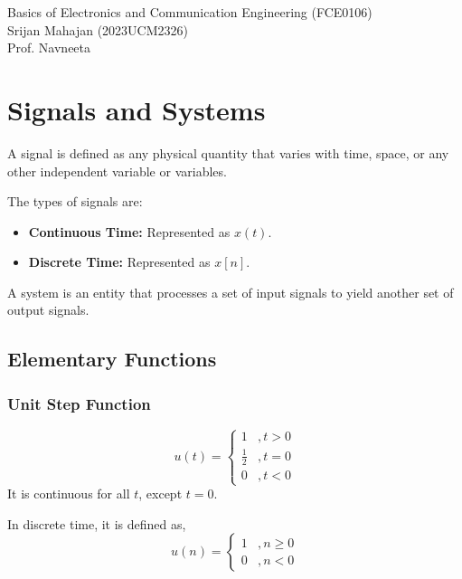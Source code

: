 


	\begin{titlepage}
			\begin{center}
			\Huge{Basics of Electronics and Communication Engineering (FCE0106)}\\
			Srijan Mahajan (2023UCM2326)\\
			Prof. Navneeta
		\end{center}
	\end{titlepage}
	\tableofcontents
	\newpage
	
	\chapter{Signals and Systems}

	A signal is defined as any physical quantity that varies with time, space, or any other independent variable or variables.
	
	The types of signals are: \begin{itemize}
		\item \textbf{ Continuous Time: }Represented as $x(t)$.
		\item \textbf{Discrete Time: }Represented as $x[n]$.
	\end{itemize}
	A system is an entity that processes a set of input signals to yield another set of output signals.
	\section{Elementary Functions}
	\subsection{Unit Step Function}
		\[u(t)=\begin{cases}
			1 &, t>0\\
			\frac{1}{2} &, t=0\\
			0&, t<0
			\end{cases}\]
			It is continuous for all $t$, except $t=0$. 
			\begin{figure}[H]
				\centering
			\end{figure}
			In discrete time, it is defined as,
			\[u(n)=\begin{cases}
				1 &, n\geq0\\
				0 &, n<0
			\end{cases}\]

